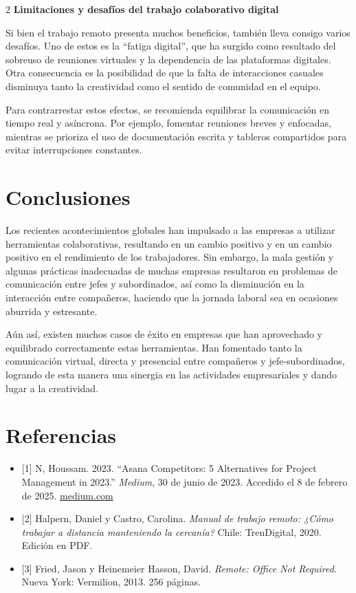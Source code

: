 \documentclass[12pt,spanish,Letterpaper,openany]{book}
\begin{document}
\begin {multicols}{2}
\textbf{Limitaciones y desafíos del trabajo colaborativo digital}

Si bien el trabajo remoto presenta muchos beneficios, también lleva consigo varios desafíos. Uno de estos
es la ``fatiga digital'', que ha surgido como resultado del sobreuso de reuniones virtuales y la dependencia
de las plataformas digitales. Otra consecuencia es la posibilidad de que la falta de interacciones casuales
disminuya tanto la creatividad como el sentido de comunidad en el equipo.

Para contrarrestar estos efectos, se recomienda equilibrar la comunicación en tiempo real y asíncrona. Por
ejemplo, fomentar reuniones breves y enfocadas, mientras se prioriza el uso de documentación escrita y
tableros compartidos para evitar interrupciones constantes.

\hypertarget{conclusiones-8}{%
\section{Conclusiones}\label{conclusiones-8}}

Los recientes acontecimientos globales han impulsado a las empresas a utilizar herramientas
colaborativas, resultando en un cambio positivo y en un cambio positivo en el rendimiento de los
trabajadores. Sin embargo, la mala gestión y algunas prácticas inadecuadas de muchas empresas
resultaron en problemas de comunicación entre jefes y subordinados, así como la disminución en la
interacción entre compañeros, haciendo que la jornada laboral sea en ocasiones aburrida y estresante.

Aún así, existen muchos casos de éxito en empresas que han aprovechado y equilibrado correctamente
estas herramientas. Han fomentado tanto la comunicación virtual, directa y presencial entre compañeros y
jefe-subordinados, logrando de esta manera una sinergia en las actividades empresariales y dando lugar a
la creatividad.

\hypertarget{referencias-8}{%
\section{Referencias}\label{referencias-8}}

\begin{itemize}
\item
  {[}1{]} N, Houssam. 2023. ``Asana Competitors: 5 Alternatives for Project Management in 2023.'' \emph{Medium}, 30 de junio de 2023. Accedido el 8 de febrero de 2025. \href{https://medium.com/buzzingsaas/asana-competitors-5-alternatives-for-project-management-in-2023-e6fd7d21cdb2}{medium.com}
\item
  {[}2{]} Halpern, Daniel y Castro, Carolina. \emph{Manual de trabajo remoto: ¿Cómo trabajar a distancia manteniendo la cercanía?} Chile: TrenDigital, 2020. Edición en PDF.
\item
  {[}3{]} Fried, Jason y Heinemeier Hasson, David. \emph{Remote: Office Not Required.} Nueva York: Vermilion, 2013. 256 páginas.
\end{itemize}

\end {multicols}
\end{document}
